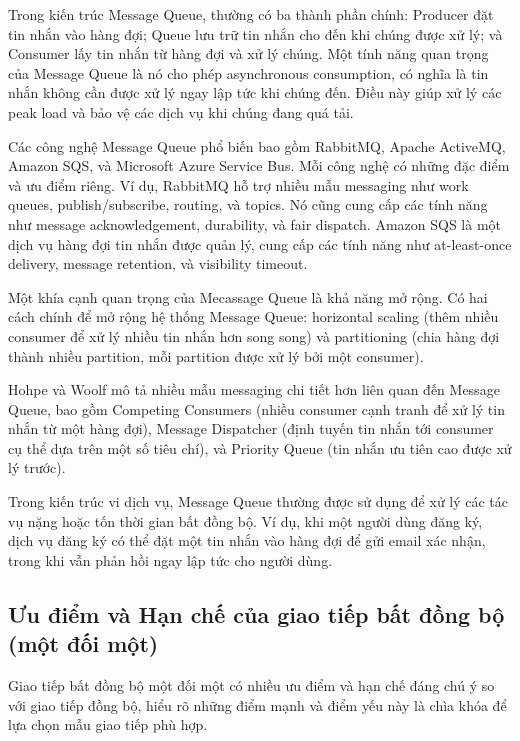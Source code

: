 Trong kiến trúc Message Queue, thường có ba thành phần chính: Producer đặt tin nhắn vào hàng đợi; Queue lưu trữ tin nhắn cho đến khi chúng được xử lý; và Consumer lấy tin nhắn từ hàng đợi và xử lý chúng. Một tính năng quan trọng của Message Queue là nó cho phép asynchronous consumption, có nghĩa là tin nhắn không cần được xử lý ngay lập tức khi chúng đến. Điều này giúp xử lý các peak load và bảo vệ các dịch vụ khi chúng đang quá tải.

Các công nghệ Message Queue phổ biến bao gồm RabbitMQ, Apache ActiveMQ, Amazon SQS, và Microsoft Azure Service Bus. Mỗi công nghệ có những đặc điểm và ưu điểm riêng. Ví dụ, RabbitMQ hỗ trợ nhiều mẫu messaging như work queues, publish/subscribe, routing, và topics. Nó cũng cung cấp các tính năng như message acknowledgement, durability, và fair dispatch. Amazon SQS là một dịch vụ hàng đợi tin nhắn được quản lý, cung cấp các tính năng như at-least-once delivery, message retention, và visibility timeout.

Một khía cạnh quan trọng của Mecassage Queue là khả năng mở rộng. Có hai cách chính để mở rộng hệ thống Message Queue: horizontal scaling (thêm nhiều consumer để xử lý nhiều tin nhắn hơn song song) và partitioning (chia hàng đợi thành nhiều partition, mỗi partition được xử lý bởi một consumer).

Hohpe và Woolf \cite{hohpe2004} mô tả nhiều mẫu messaging chi tiết hơn liên quan đến Message Queue, bao gồm Competing Consumers (nhiều consumer cạnh tranh để xử lý tin nhắn từ một hàng đợi), Message Dispatcher (định tuyến tin nhắn tới consumer cụ thể dựa trên một số tiêu chí), và Priority Queue (tin nhắn ưu tiên cao được xử lý trước).

Trong kiến trúc vi dịch vụ, Message Queue thường được sử dụng để xử lý các tác vụ nặng hoặc tốn thời gian bất đồng bộ. Ví dụ, khi một người dùng đăng ký, dịch vụ đăng ký có thể đặt một tin nhắn vào hàng đợi để gửi email xác nhận, trong khi vẫn phản hồi ngay lập tức cho người dùng.

\subsection{Ưu điểm và Hạn chế của giao tiếp bất đồng bộ (một đối một)}
Giao tiếp bất đồng bộ một đối một có nhiều ưu điểm và hạn chế đáng chú ý so với giao tiếp đồng bộ, hiểu rõ những điểm mạnh và điểm yếu này là chìa khóa để lựa chọn mẫu giao tiếp phù hợp.

